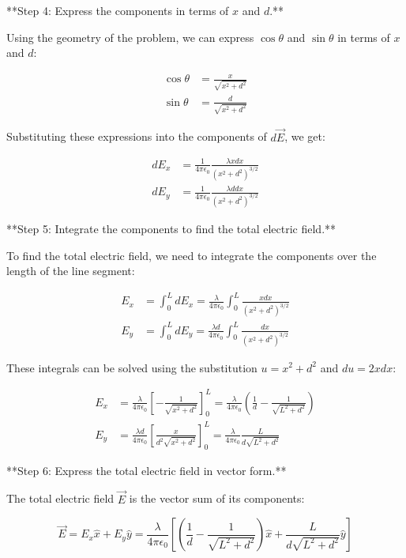 \documentclass{article}
\begin{document}
**Step 4: Express the components in terms of \(x\) and \(d\).**

Using the geometry of the problem, we can express \(\cos\theta\) and \(\sin\theta\) in terms of \(x\) and \(d\):

\begin{align*}
\cos\theta &= \frac{x}{\sqrt{x^2 + d^2}} \\
\sin\theta &= \frac{d}{\sqrt{x^2 + d^2}}
\end{align*}

Substituting these expressions into the components of \(d\vec{E}\), we get:

\begin{align*}
dE_x &= \frac{1}{4\pi\epsilon_0} \frac{\lambda x dx}{(x^2 + d^2)^{3/2}} \\
dE_y &= \frac{1}{4\pi\epsilon_0} \frac{\lambda d dx}{(x^2 + d^2)^{3/2}}
\end{align*}

**Step 5: Integrate the components to find the total electric field.**

To find the total electric field, we need to integrate the components over the length of the line segment:

\begin{align*}
E_x &= \int_0^L dE_x = \frac{\lambda}{4\pi\epsilon_0} \int_0^L \frac{x dx}{(x^2 + d^2)^{3/2}} \\
E_y &= \int_0^L dE_y = \frac{\lambda d}{4\pi\epsilon_0} \int_0^L \frac{dx}{(x^2 + d^2)^{3/2}}
\end{align*}

These integrals can be solved using the substitution \(u = x^2 + d^2\) and \(du = 2x dx\):

\begin{align*}
E_x &= \frac{\lambda}{4\pi\epsilon_0} \left[-\frac{1}{\sqrt{x^2 + d^2}}\right]_0^L = \frac{\lambda}{4\pi\epsilon_0} \left(\frac{1}{d} - \frac{1}{\sqrt{L^2 + d^2}}\right) \\
E_y &= \frac{\lambda d}{4\pi\epsilon_0} \left[\frac{x}{d^2 \sqrt{x^2 + d^2}}\right]_0^L = \frac{\lambda}{4\pi\epsilon_0} \frac{L}{d\sqrt{L^2 + d^2}}
\end{align*}

**Step 6: Express the total electric field in vector form.**

The total electric field \(\vec{E}\) is the vector sum of its components:

\begin{equation*}
\vec{E} = E_x \hat{x} + E_y \hat{y} = \frac{\lambda}{4\pi\epsilon_0} \left[ \left(\frac{1}{d} - \frac{1}{\sqrt{L^2 + d^2}}\right) \hat{x} + \frac{L}{d\sqrt{L^2 + d^2}} \hat{y} \right]
\end{equation*}
\end{document}
